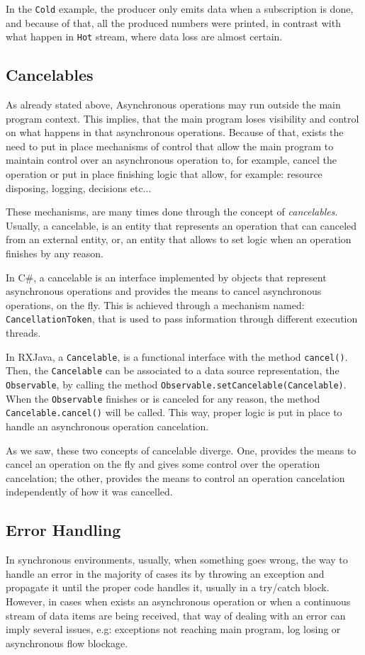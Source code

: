 	In the \texttt{Cold} example, the producer only emits data when a subscription is done, and because of that, all the produced numbers were printed, in contrast with what happen in \texttt{Hot} stream, where data loss are almost certain. 
	\clearpage
	\subsection{Cancelables} 
	As already stated above, Asynchronous operations may run outside the main program context. 
	This implies, that the main program loses visibility and control on what happens in that asynchronous operations.
	Because of that, exists the need to put in place mechanisms of control that allow the main program to maintain control over an asynchronous operation to, for example, cancel the operation or put in place finishing logic that allow, for example: resource disposing, logging, decisions etc...

	These mechanisms, are many times done through the concept of \textit{cancelables}. 
	Usually, a cancelable, is an entity that represents an operation that can canceled from an external entity, or, an entity that allows to set logic when an operation finishes by any reason.
 
	In C\#, a cancelable is an interface implemented by objects that represent asynchronous operations and provides the means to cancel asynchronous operations, on the fly. 
	This is achieved through a mechanism named: \texttt{CancellationToken}, that is used to pass information through different execution threads. 
	
	In RXJava, a \texttt{Cancelable}, is a functional interface with the method \texttt{cancel()}. Then, the \texttt{Cancelable} can be associated to a data source representation, the \texttt{Observable}, by calling the method \texttt{Observable.setCancelable(Cancelable)}. 
	When the \texttt{Observable} finishes or is canceled for any reason, the method \texttt{Cancelable.cancel()} will be called. 
	This way,  proper logic is put in place to handle an asynchronous operation cancelation.
	
	As we saw, these two concepts of cancelable diverge. One, provides the means to cancel an operation on the fly and gives some control over the operation cancelation; the other, provides the means to control an operation cancelation independently of how it was cancelled.
	
	\clearpage
	\subsection{Error Handling}  
	In synchronous environments, usually, when something goes wrong, the way to handle an error in the majority of cases its by throwing an exception and propagate it until the proper code handles it, usually  in a try/catch block. 
	However, in cases when exists an asynchronous operation or when a continuous stream of data items are being received, that way of dealing with an error can imply several issues, e.g: exceptions not reaching main program, log losing or asynchronous flow blockage. 
	
